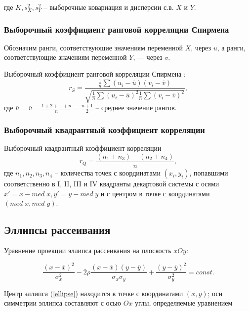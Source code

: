 \documentclass[12pt]{article}
\begin{document}
\begin{flushleft}
            где $K, s_X^2, s_Y^2$ -- выборочные ковариация и дисперсии с.в. $X$ и $Y$.

        \subsubsection{Выборочный коэффициент ранговой корреляции Спирмена}
        Обозначим ранги, соответствующие значениям переменной $X$, через $u$, а ранги, соответствующие значениям переменной $Y$, — через $v$.

        Выборочный коэффициент ранговой корреляции Спирмена :
        \begin{equation}
            r_S = \frac{\frac{1}{n} \sum (u_i - \overline{u})(v_i - \overline{v})}{\sqrt{\frac{1}{n} \sum (u_i - \overline{u})^2 \frac{1}{n} \sum (v_i - \overline{v})^2}},
            \label{spirmen}
        \end{equation} 
        где $\overline{u} = \overline{v} = \frac{1 + 2 + ... + n}{n} = \frac{n+1}{2}$ -- среднее значение рангов.

        \subsubsection{Выборочный квадрантный коэффициент корреляции}
            Выборочный квадрантный коэффициент корреляции
            \begin{equation}
                r_Q = \frac{(n_1+n_3) - (n_2 + n_4)}{n}, 
                \label{square}
            \end{equation} 
            где $n_1, n_2, n_3, n_4$ -- количества точек с координатами $(x_i, y_i)$, попавшими соответственно в I, II, III и IV квадранты декартовой системы с осями $x' = x - med \; x, y' = y - med \; y$ и с центром в точке с координатами $(med \; x, med \; y)$.

    \subsection{Эллипсы рассеивания}

    Уравнение проекции эллипса рассеивания на плоскость $xOy$:

    \begin{equation}
        \frac{(x-\overline{x})^2}{\sigma_x^2} - 2\rho\frac{(x-\overline{x})(y-\overline{y})}{\sigma_x\sigma_y} + \frac{(y-\overline{y})^2}{\sigma_y^2} = const.
        \label{ellipse}
    \end{equation}

    Центр эллипса (\ref{ellipse}) находится в точке с координатами $(\overline{x}, \overline{y})$; оси симметрии эллипса составляют с осью $Ox$ углы, определяемые уравнением


\end{flushleft}
\end{document}
